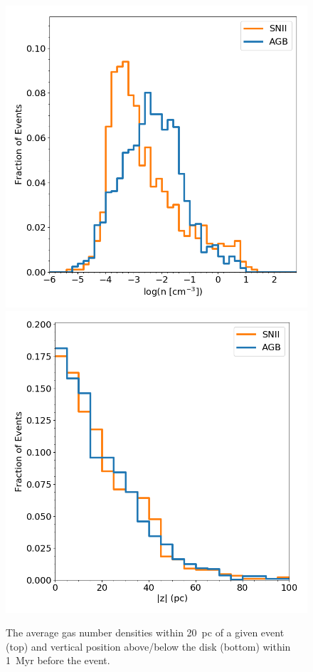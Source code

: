 \documentclass[twocolumn]{aastex61}
\begin{document}
\begin{figure}
\centering
\includegraphics[width=0.95\linewidth]{SE_density.png}\\
\includegraphics[width=0.95\linewidth]{SE_z.png}
\caption{The average gas number densities within 20~pc of a given event (top) and vertical position above/below the disk (bottom) within 1~Myr before the event.}
\label{fig:spatial distribution}
\end{figure}
\end{document}

